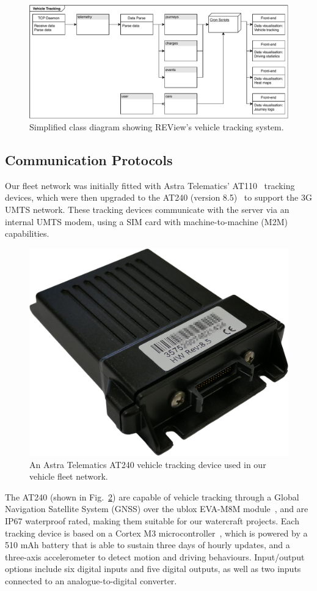 \begin{figure}[H]
	\centering
	\includegraphics[width=\linewidth]{uml-vt}
	\caption{Simplified class diagram showing REView’s vehicle tracking system.}
	\label{fig:9:umlvt}
\end{figure}

\subsection{Communication Protocols}
Our fleet network was initially fitted with Astra Telematics’ AT110~\cite{astra_telematics_limited_at110_nodate} tracking devices, which were then upgraded to the AT240 (version 8.5)~\cite{astra_telematics_limited_at240_nodate} to support the 3G UMTS network. These tracking devices communicate with the server via an internal UMTS modem, using a SIM card with machine-to-machine (M2M) capabilities. 


\begin{figure}[H]
	\centering
	\includegraphics[width=0.4\linewidth]{at240-rs}
	\caption[Astra Telematics AT240 vehicle tracking device]{An Astra Telematics AT240 vehicle tracking device used in our vehicle fleet network.}
	\label{fig:9:vtmodem}
\end{figure}

The AT240 (shown in Fig.~\ref{fig:9:vtmodem}) are capable of vehicle tracking through a Global Navigation Satellite System (GNSS) over the ublox EVA-M8M module~\cite{u-blox_ag_eva-m8_2016}, and are IP67 waterproof rated, making them suitable for our watercraft projects. Each tracking device is based on a Cortex M3 microcontroller~\cite{yiu_armv8-m_2015}, which is powered by a 510 mAh battery that is able to sustain three days of hourly updates, and a three-axis accelerometer to detect motion and driving behaviours. Input/output options include six digital inputs and five digital outputs, as well as two inputs connected to an analogue-to-digital converter. 

